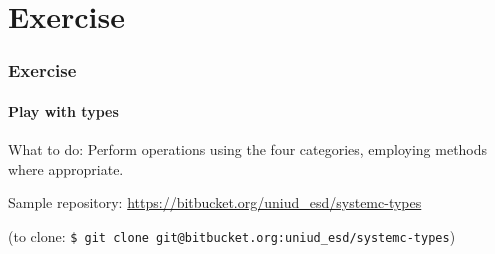 \section{Exercise}

\begin{frame}
\frametitle{Exercise}
\framesubtitle{Play with types}

\begin{block}{What to do:}
Perform operations using the four categories, employing methods where appropriate.
\end{block}
\begin{block}{Sample repository:}
\url{https://bitbucket.org/uniud_esd/systemc-types} 

\medskip
{\scriptsize (to clone: \texttt{\$ git clone git@bitbucket.org:uniud\_esd/systemc-types})}
\end{block}

\end{frame}
